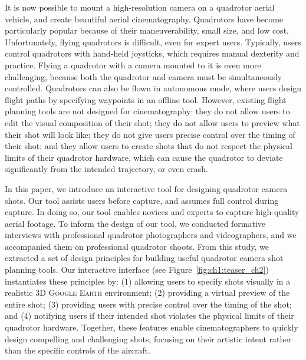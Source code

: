
\label{sec:ch2}

It is now possible to mount a high-resolution camera on a quadrotor aerial vehicle, and create beautiful aerial cinematography.
Quadrotors have become particularly popular because of their maneuverability, small size, and low cost.
Unfortunately, flying quadrotors is difficult, even for expert users.
Typically, users control quadrotors with hand-held joysticks, which requires manual dexterity and practice.
Flying a quadrotor with a camera mounted to it is even more challenging, because both the quadrotor and camera must be simultaneously controlled. 
Quadrotors can also be flown in autonomous mode, where users design flight paths by specifying waypoints in an offline tool. 
However, existing flight planning tools are not designed for cinematography: they do not allow users to edit the visual composition of their shot; they do not allow users to preview what their shot will look like; they do not give users precise control over the timing of their shot; and they allow users to create shots that do not respect the physical limits of their quadrotor hardware, which can cause the quadrotor to deviate significantly from the intended trajectory, or even crash.

In this paper, we introduce an interactive tool for  designing quadrotor camera shots. Our tool assists users before capture, and assumes full control during capture.
In doing so, our tool enables novices and experts to capture high-quality aerial footage.
To inform the design of our tool, we conducted formative interviews with professional quadrotor photographers and videographers, and we accompanied them on professional quadrotor shoots.
From this study, we extracted a set of design principles for building useful quadrotor camera shot planning tools. 
Our interactive interface (see Figure~\ref{fig:ch1:teaser_ch2}) instantiates these principles by: (1) allowing users to specify shots visually in a realistic 3D \textsc{Google Earth} environment; (2) providing a virtual preview of the entire shot; (3) providing users with precise control over the timing of the shot; and (4) notifying users if their intended shot violates the physical limits of their quadrotor hardware.
Together, these features enable cinematographers to quickly design compelling and challenging shots, focusing on their artistic intent rather than the specific controls of the aircraft. 


